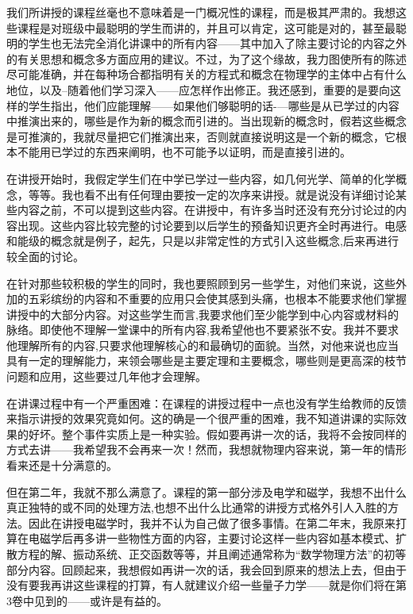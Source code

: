 \documentclass[UTF8, 12pt, a4paper, twoside]{ctexbook}
\begin{document}
我们所讲授的课程丝毫也不意味着是一门概况性的课程，而是极其严肃的。我想这些课程是对班级中最聪明的学生而讲的，并且可以肯定，这可能是对的，甚至最聪明的学生也无法完全消化讲课中的所有内容——其中加入了除主要讨论的内容之外的有关思想和概念多方面应用的建议。不过，为了这个缘故，我力图使所有的陈述尽可能准确，并在每种场合都指明有关的方程式和概念在物理学的主体中占有什么地位，以及--随着他们学习深入——应怎样作出修正。我还感到，重要的是要向这样的学生指出，他们应能理解——如果他们够聪明的话-—哪些是从已学过的内容中推演出来的，哪些是作为新的概念而引进的。当出现新的概念时，假若这些概念是可推演的，我就尽量把它们推演出来，否则就直接说明这是一个新的概念，它根本不能用已学过的东西来阐明，也不可能予以证明，而是直接引进的。
      
在讲授开始时，我假定学生们在中学已学过一些内容，如几何光学、简单的化学概念，等等。我也看不出有任何理由要按一定的次序来讲授。就是说没有详细讨论某些内容之前，不可以提到这些内容。在讲授中，有许多当时还没有充分讨论过的内容出现。这些内容比较完整的讨论要到以后学生的预备知识更齐全时再进行。电感和能级的概念就是例子，起先，只是以非常定性的方式引入这些概念,后来再进行较全面的讨论。
      
在针对那些较积极的学生的同时，我也要照顾到另一些学生，对他们来说，这些外加的五彩缤纷的内容和不重要的应用只会使其感到头痛，也根本不能要求他们掌握讲授中的大部分内容。对这些学生而言,我要求他们至少能学到中心内容或材料的脉络。即使他不理解一堂课中的所有内容,我希望他也不要紧张不安。我并不要求他理解所有的内容,只要求他理解核心的和最确切的面貌。当然，对他来说也应当具有一定的理解能力，来领会哪些是主要定理和主要概念，哪些则是更高深的枝节问题和应用，这些要过几年他才会理解。

在讲课过程中有一个严重困难：在课程的讲授过程中一点也没有学生给教师的反馈来指示讲授的效果究竟如何。这的确是一个很严重的困难，我不知道讲课的实际效果的好坏。整个事件实质上是一种实验。假如要再讲一次的话，我将不会按同样的方式去讲——我希望我不会再来一次！然而，我想就物理内容来说，第一年的情形看来还是十分满意的。
  
但在第二年，我就不那么满意了。课程的第一部分涉及电学和磁学，我想不出什么真正独特的或不同的处理方法,也想不出什么比通常的讲授方式格外引人入胜的方法。因此在讲授电磁学时，我并不认为自己做了很多事情。在第二年末，我原来打算在电磁学后再多讲一些物性方面的内容，主要讨论这样一些内容如基本模式、扩散方程的解、振动系统、正交函数等等，并且阐述通常称为“数学物理方法”的初等部分内容。回顾起来，我想假如再讲一次的话，我会回到原来的想法上去，但由于没有要我再讲这些课程的打算，有人就建议介绍一些量子力学——就是你们将在第3卷中见到的——或许是有益的。
  
\end{document}
